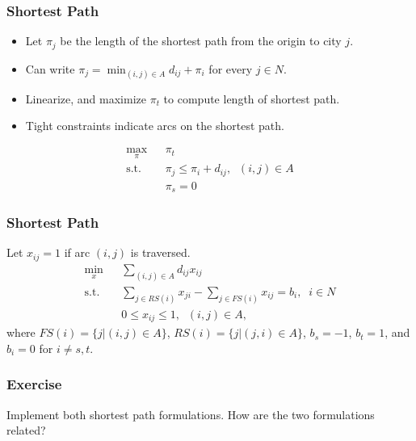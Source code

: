 \documentclass[12pt,handout]{beamer}
\begin{document}

\begin{frame}
\frametitle{Shortest Path}
\begin{itemize}
\item Let $\pi_j$ be the length of the shortest path from the origin to city $j$.
\item Can write $\pi_j = \min_{(i,j) \in A} d_{ij} + \pi_i$ for every $j \in N$.
\item Linearize, and maximize $\pi_t$ to compute length of shortest path.
\item Tight constraints indicate arcs on the shortest path.
\end{itemize}
\begin{eqnarray}
\max_{\pi} && \pi_t \nonumber \\
\mbox{s.t.} && \pi_j \le \pi_i + d_{ij},\;\;(i,j) \in A \nonumber \\
&& \pi_s = 0 \nonumber
\end{eqnarray}
\end{frame}

\begin{frame}
\frametitle{Shortest Path}
Let $x_{ij} = 1$ if arc $(i,j)$ is traversed.
\begin{eqnarray}
\min_x && \sum_{(i,j) \in A} d_{ij} x_{ij} \nonumber \\
\mbox{s.t.} && \sum_{j \in RS(i)} x_{ji} - \sum_{j \in FS(i)} x_{ij} = b_i,\;\;i \in N \nonumber \\
&& 0 \le x_{ij} \le 1,\;\;(i,j) \in A, \nonumber
\end{eqnarray}
\noindent where $FS(i) = \{j | (i,j) \in A\}$, $RS(i) = \{j | (j, i) \in A\}$, $b_s = -1$, $b_t = 1$, and $b_i = 0$ for $i \neq s, t$.
\end{frame}

\begin{frame}
\frametitle{Exercise}
Implement both shortest path formulations. How are the two formulations related?
\end{frame}
\end{document}

